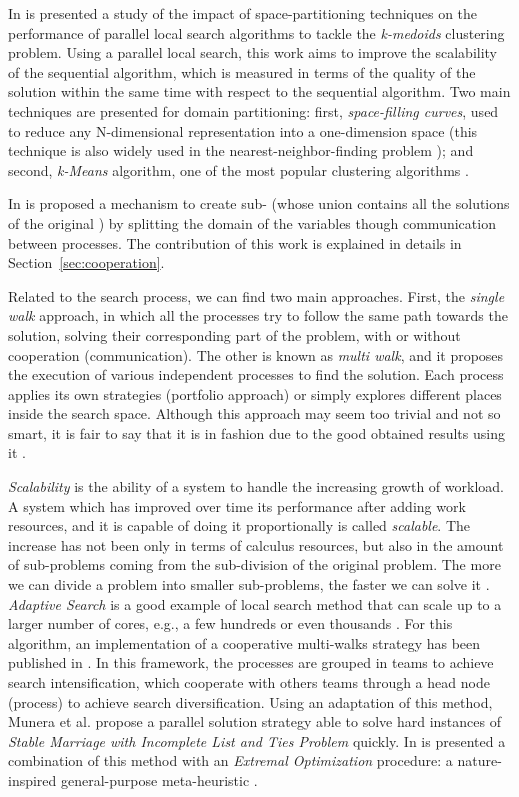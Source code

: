 In \cite{Arbelaez2012} is presented a study of the impact of space-partitioning techniques on the performance of parallel local search algorithms to tackle the \textit{k-medoids} clustering problem. Using a parallel local search, this work aims to improve the scalability of the sequential algorithm, which is measured in terms of the quality of the solution within the same time with respect to the sequential algorithm. Two main techniques are presented for domain partitioning: first, {\it space-filling curves}, used to reduce any N-dimensional representation into a one-dimension space (this technique is also widely used in the nearest-neighbor-finding problem \cite{Chen2005}); and second, {\it k-Means} algorithm, one of the most popular clustering algorithms \cite{Berkhin2002}.

In \cite{Arbab2000} is proposed a mechanism to create sub-\csps{} (whose union contains all the solutions of the original \csp) by splitting the domain of the variables though communication between processes. The contribution of this work is explained in details in Section~\ref{sec:cooperation}.

Related to the search process, we can find two main approaches. First, the {\it single walk} approach, in which all the processes try to follow the same path towards the solution, solving their corresponding part of the problem, with or without cooperation (communication). The other is known as {\it multi walk}, and it proposes the execution of various independent processes to find the solution. Each process applies its own strategies (portfolio approach) or simply explores different places inside the search space. Although this approach may seem too trivial and not so smart, it is fair to say that it is in fashion due to the good obtained results using it \cite{Diaz}.

\textit{Scalability} is the ability of a system to handle the increasing growth of workload. A system which has improved over time its performance after adding work resources, and it is capable of doing it proportionally is called {\it scalable}. The increase has not been only in terms of calculus resources, but also in the amount of sub-problems coming from the sub-division of the original problem. The more we can divide a problem into smaller sub-problems, the faster we can solve it \cite{Hill}. \textit{Adaptive Search} is a good example of local search method that can scale up to a larger number of cores, e.g., a few hundreds or even thousands \cite{Diaz}. For this algorithm, an implementation of a cooperative multi-walks strategy has been published in \cite{Munera}. In this framework, the processes are grouped in teams to achieve search intensification, which cooperate with others teams through a head node (process) to achieve search diversification. Using an adaptation of this method, Munera et al. propose a parallel solution strategy able to solve hard instances of \textit{Stable Marriage with Incomplete List and Ties Problem} quickly. In \cite{Munera2016} is presented a combination of this method with an \textit{Extremal Optimization} procedure: a nature-inspired general-purpose meta-heuristic \cite{Boettcher2000}. 

